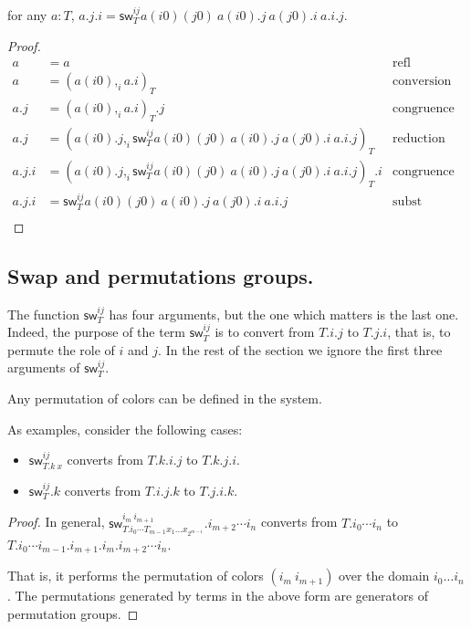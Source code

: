 \documentclass[10pt,a4paper]{article}
\newcommand\CC[4]{(#2,_{#1} #3)_{#4}}
\newcommand\sw[2]{\mathsf{sw}^{#1}_{#2}}
\begin{document}
\begin{lemma}\label{lem:term-swap}
  for any $a:T$, $a.j.i = \sw {ij} T a(i0)(j0)~a(i0).j~a(j0).i~a.i.j$.
\end{lemma}
\begin{proof}
  \begin{align*}
    a &= a & \text{refl} \\
    a &= \CC i {a(i0)} {a.i} T & \text{conversion rule} \\
    a.j & = \CC i {a(i0)} {a.i} T .j & \text{congruence} \\
    a.j & = \CC i {a(i0).j} {\sw{ij} T a(i0)(j0)~a(i0).j~a(j0).i~a.i.j} T & \text{reduction} \\
    a.j.i & = \CC i {a(i0).j} {\sw{ij} T a(i0)(j0)~a(i0).j~a(j0).i~a.i.j} T.i & \text{congruence} \\
    a.j.i & = \sw{ij} T a(i0)(j0)~a(i0).j~a(j0).i~a.i.j & \text{subst} \\
\end{align*}
\end{proof}
\subsection{Swap and permutations groups.}

The function $\sw {ij} T$ has four arguments, but the one which
matters is the last one.  Indeed, the purpose of the term $\sw {ij} T$
is to convert from $T.i.j$ to $T.j.i$, that is, to permute the role of
$i$ and $j$. In the rest of the section we ignore the first three
arguments of $\sw {ij} T$.

\begin{theorem}
Any permutation of colors can be defined in the system.

As examples, consider the following cases:
\begin{itemize}
\item $\sw{ij} {T.k~x}$ converts from $T.k.i.j$ to $T.k.j.i$.
\item $\sw{ij} {T}.k$ converts from $T.i.j.k$ to $T.j.i.k$.
\end{itemize}

\end{theorem}

\begin{proof}
  In general, $\sw{i_m~i_{m+1}} {T.i_0⋯T_{m-1} x_1 …
    x_{2^{m-1}}}.i_{m+2}⋯i_n$ converts from $T.i_0 ⋯ i_n$ to
  $T.i_0⋯i_{m-1}.i_{m+1}.i_m .i_{m+2}⋯i_n$.

  That is, it performs the permutation of colors $(i_m~i_{m+1})$ over
  the domain $i_0 … i_n$. The permutations generated by terms in the
  above form are generators of permutation groups.
\end{proof}
\end{document}
